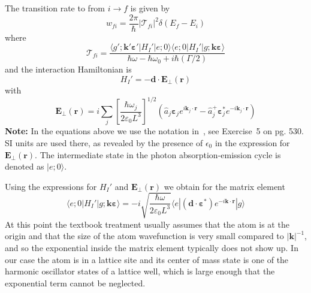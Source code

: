 \documentclass[11pt,letter]{article}
\newcommand{\bv}[1]{\ensuremath{\bm{#1}}}
\begin{document}
The transition rate to from $i\rightarrow f$ is given by~\cite{cohen1998atom} 
\begin{equation}
    \label{eq:transitionRate}
    w_{fi} = \frac{2\pi}{\hbar} | \mathcal{T}_{fi} |^{2} \delta(E_{f}-E_{i})
\end{equation}
where 
\begin{equation}
    \mathcal{T}_{fi} = \frac{  
        \langle g'; \bv{k}'\bv{\varepsilon}'| H_{I}' | e; 0 \rangle 
        \langle e; 0 | H_{I}' | g; \bv{k}\bv{\varepsilon} \rangle }
        { \hbar\omega - \hbar\omega_{0} + i\hbar (\Gamma/2 ) }
\end{equation} 
and the interaction Hamiltonian is 
\begin{equation}
    H_{I}' = -\bv{d} \cdot \bv{E}_{\perp} ( \bv{r} ) 
\end{equation}
with 
\begin{equation}
    \bv{E}_{\perp}(\bv{r}) = i \sum_{j} 
        \left[ \frac{ \hbar \omega_{j} }{ 2\varepsilon_{0} L^{3}}  \right]^{1/2}
        \left( \hat{a}_{j}\bv{\varepsilon}_{j} e^{i\bv{k}_{j}\cdot\bv{r}} 
              - \hat{a}_{j}^{+}\bv{\varepsilon}_{j}^{*} e^{-i\bv{k}_{j}
                \cdot\bv{r}} 
        \right)
\end{equation}
\textbf{Note:}  In the equations above we use the notation
in~\cite{cohen1998atom},  see Exercise~5 on pg. 530.   SI units are used there,
as revealed by the presence of $\epsilon_{0}$ in the expression for
$\bv{E}_{\perp}(\bv{r})$.   The intermediate state in the photon
absorption-emission cycle is denoted as $|e;0\rangle$. 

Using the expressions for $H_{I}'$ and $\bv{E}_{\perp}(\bv{r})$ we obtain for
the matrix element 
\begin{equation}
   \langle e; 0 | H_{I}' | g; \bv{k}\bv{\varepsilon} \rangle = 
       -i \sqrt{ \frac{ \hbar \omega }{2 \varepsilon_{0} L^{3} }} 
      \langle e | (\bv{d} \cdot \bv{\varepsilon}^{*} ) 
       e^{-i\bv{k}\cdot\bv{r}}| g \rangle
\end{equation}
At this point the textbook treatment usually assumes that the atom is at the
origin and that the size of the atom wavefunction is very small compared to
$|\bv{k}|^{-1}$, and so the exponential inside the matrix element typically
does not show up.  In our case the atom is in a lattice site and its center of
mass state is one of the harmonic oscillator states of a lattice well, which is
large enough that the exponential term cannot be neglected.  
 
\end{document}
